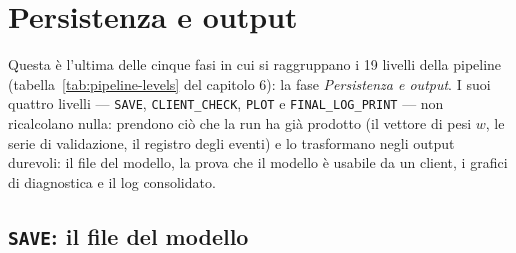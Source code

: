 %
%
%
%
%
%
%
%

%

\chapter{Persistenza e output}

Questa è l'ultima delle cinque fasi in cui si raggruppano i 19 livelli della
pipeline (tabella~\ref{tab:pipeline-levels} del capitolo 6): la fase
\emph{Persistenza e output}. I suoi quattro livelli — \texttt{SAVE},
\texttt{CLIENT\_CHECK}, \texttt{PLOT} e \texttt{FINAL\_LOG\_PRINT} — non
ricalcolano nulla: prendono ciò che la run ha già prodotto (il vettore di
pesi $w$, le serie di validazione, il registro degli eventi) e lo
trasformano negli output durevoli: il file del modello, la prova che il
modello è usabile da un client, i grafici di diagnostica e il log
consolidato.

\section{\texttt{SAVE}: il file del modello}

